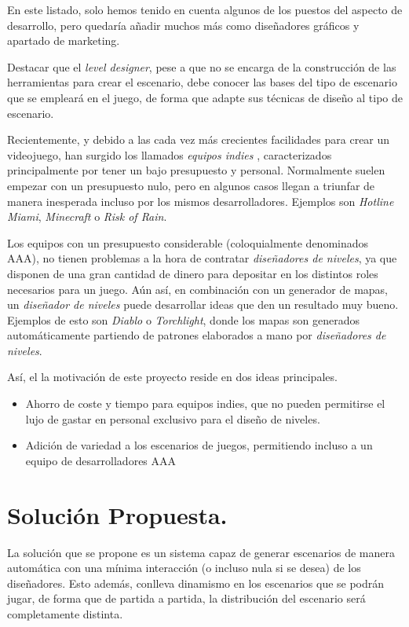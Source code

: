 En este listado, solo hemos tenido en cuenta algunos de los puestos del aspecto de desarrollo, pero quedaría añadir muchos más como diseñadores gráficos y apartado de marketing.

Destacar que el \emph{level designer}, pese a que no se encarga de la construcción de las herramientas para crear el escenario, debe conocer las bases del tipo de escenario que se empleará en el juego, de forma que adapte sus técnicas de diseño al tipo de escenario.

Recientemente, y debido a las cada vez más crecientes facilidades para crear un videojuego, han surgido los llamados \emph{equipos indies} \cite{gdindie}, caracterizados principalmente por tener un bajo presupuesto y personal. Normalmente suelen empezar con un presupuesto nulo, pero en algunos casos llegan a triunfar de manera inesperada incluso por los mismos desarrolladores. Ejemplos son \emph{Hotline Miami}, \emph{Minecraft} o \emph{Risk of Rain}.

Los equipos con un presupuesto considerable (coloquialmente denominados AAA), no tienen problemas a la hora de contratar \emph{diseñadores de niveles}, ya que disponen de una gran cantidad de dinero para depositar en los distintos roles necesarios para un juego. Aún así, en combinación con un generador de mapas, un \emph{diseñador de niveles} puede desarrollar ideas que den un resultado muy bueno. Ejemplos de esto son \emph{Diablo} o \emph{Torchlight}, donde los mapas son generados automáticamente partiendo de patrones elaborados a mano por \emph{diseñadores de niveles}.

Así, el la motivación de este proyecto reside en dos ideas principales.

\begin{itemize}
	\item Ahorro de coste y tiempo para equipos indies, que no pueden permitirse el lujo de gastar en personal exclusivo para el diseño de niveles.
	\item Adición de variedad a los escenarios de juegos, permitiendo incluso a un equipo de desarrolladores AAA
\end{itemize}


\section*{Solución Propuesta.}

La solución que se propone es un sistema capaz de generar escenarios de manera automática con una mínima interacción (o incluso nula si se desea) de los diseñadores. Esto además, conlleva dinamismo en los escenarios que se podrán jugar, de forma que de partida a partida, la distribución del escenario será completamente distinta.

